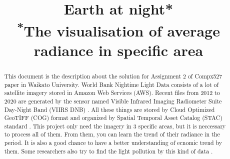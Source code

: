\documentclass[conference]{IEEEtran}
\begin{document}
 
  
\title{Earth at night*\\
{\footnotesize \textsuperscript{*}The visualisation of average radiance in specific area}
}
 
\author{
\and
{}
\and
{}
\and
{}
\and
{}
} 

\maketitle

\begin{abstract}
This document is the description about the solution for Assignment 2 of Compx527 paper 
in Waikato University. World Bank Nightime Light Data consists of a lot of satellite imagery 
stored in Amazon Web Services (AWS). Recent files from 2012 to 2020 are generated by the sensor 
named Visible Infrared Imaging Radiometer Suite Day-Night Band (VIIRS DNB) \cite{WorldBan13:online}. All these things are 
stored by Cloud Optimized GeoTIFF (COG) \cite{CloudOpt5:online} format and organized by Spatial Temporal Asset Catalog (STAC) standard \cite{SpatioTe90:online}. 
This project only need the imagery in 3 specific areas, but it is neccessary to process all of them. 
From them, you can learn the trend of their radiance in the period. It is also a good chance to have a better understanding of ecnomic trend by them.
Some researchers also try to find the light pollution by this kind of data \cite{BARA2020106658}.
\end{abstract}
\end{document}
